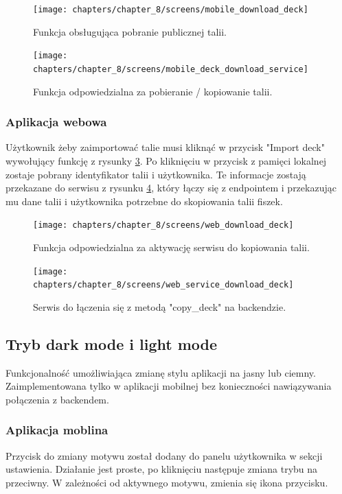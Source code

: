 \begin{figure}[H]
    \centering
    \texttt{[image: chapters/chapter\_8/screens/mobile\_download\_deck]}
    \caption{Funkcja obsługująca pobranie publicznej talii.}
    \label{img:mobile_download_deck}
\end{figure}

\begin{figure}[H]
    \centering
    \texttt{[image: chapters/chapter\_8/screens/mobile\_deck\_download\_service]}
    \caption{Funkcja odpowiedzialna za pobieranie / kopiowanie talii.}
    \label{img:mobile_deck_download_service}
\end{figure}

\subsubsection{Aplikacja webowa}
Użytkownik żeby zaimportować talie musi kliknąć w przycisk "Import deck" wywołujący funkcję z rysunky \ref{img:web_download_deck}. Po kliknięciu w przycisk z pamięci lokalnej zostaje pobrany identyfikator talii i użytkownika. Te informacje zostają przekazane do serwisu z rysunku \ref{img:web_service_download_deck}, który łączy się z endpointem i przekazując mu dane talii i użytkownika potrzebne do skopiowania talii fiszek.

\begin{figure}[H]
    \centering
    \texttt{[image: chapters/chapter\_8/screens/web\_download\_deck]}
    \caption{Funkcja odpowiedzialna za aktywację serwisu do kopiowania talii.}
    \label{img:web_download_deck}
\end{figure}

\begin{figure}[H]
    \centering
    \texttt{[image: chapters/chapter\_8/screens/web\_service\_download\_deck]}
    \caption{Serwis do łączenia się z metodą "copy\_deck" na backendzie.}
    \label{img:web_service_download_deck}
\end{figure}

\subsection{Tryb dark mode i light mode}
Funkcjonalność umożliwiająca zmianę stylu aplikacji na jasny lub ciemny. Zaimplementowana tylko w aplikacji mobilnej bez konieczności nawiązywania połączenia z backendem.

\subsubsection{Aplikacja moblina}
Przycisk do zmiany motywu został dodany do panelu użytkownika w sekcji ustawienia. Działanie jest proste, po kliknięciu następuje zmiana trybu na przeciwny. W zależności od aktywnego motywu, zmienia się ikona przycisku.

